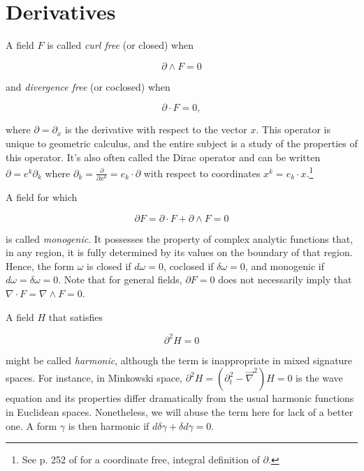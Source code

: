 \documentclass[twocolumn]{article}
\begin{document}
\section{Derivatives}

A field $F$ is called \emph{curl free} (or closed) when 

\begin{equation}
  \partial \wedge F = 0
\end{equation}

and \emph{divergence free} (or coclosed) when 

\begin{equation}
  \partial \cdot F = 0,
\end{equation}

where $\partial = \partial_x$ is the derivative with respect to the vector $x$. This operator is unique to geometric calculus, and the entire subject is a study of the properties of this operator. It's also often called the Dirac operator and can be written $\partial = e^k \partial_k$ where $\partial_k = \frac{\partial}{\partial x^k} = e_k \cdot \partial$ with respect to coordinates $x^k = e_k \cdot x$.\footnote{See p. 252 of \cite{cagc} for a coordinate free, integral definition of $\partial$.}

A field for which

\begin{equation}
  \partial F = \partial \cdot F + \partial \wedge F = 0
\end{equation}

is called \emph{monogenic}. It possesses the property of complex analytic functions that, in any region, it is fully determined by its values on the boundary of that region. Hence, the form $\omega$ is closed if $d \omega = 0$, coclosed if $\delta \omega = 0$, and monogenic if $d \omega = \delta \omega = 0$. Note that for general fields, $\partial F = 0$ does not necessarily imply that $\nabla \cdot F = \nabla \wedge F = 0$.

A field $H$ that satisfies

\begin{equation}
  \partial^2 H = 0
\end{equation}

might be called \emph{harmonic}, although the term is inappropriate in mixed signature spaces. For instance, in Minkowski space, $\partial^2 H = (\partial_t^2 - \vec \nabla^2) H = 0$ is the wave equation and its properties differ dramatically from the usual harmonic functions in Euclidean spaces. Nonetheless, we will abuse the term here for lack of a better one. A form $\gamma$ is then harmonic if $d \delta \gamma + \delta d \gamma = 0$.
\end{document}
